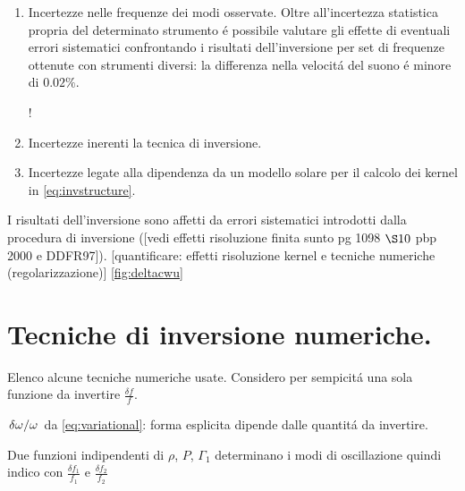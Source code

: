 \documentclass[../main.tex]{subfiles}
\begin{document}
\begin{enumerate}

\item Incertezze nelle frequenze dei modi osservate. Oltre all'incertezza statistica propria del determinato strumento \'e possibile valutare gli effette di eventuali errori sistematici confrontando i risultati dell'inversione per set di frequenze ottenute con strumenti diversi: la differenza nella velocit\'a del suono \'e minore di $0.02\%$.

\begin{workout}
!
\end{workout}


\item Incertezze inerenti la tecnica di inversione.

\item Incertezze legate alla dipendenza da un modello solare per il calcolo dei kernel in \eqref{eq:invstructure}.

\end{enumerate}

\begin{workout}
I risultati dell'inversione sono affetti da errori sistematici introdotti dalla procedura di inversione ([vedi effetti risoluzione finita sunto pg 1098 $\S 10$ pbp 2000 e DDFR97]).
[quantificare: effetti risoluzione kernel e tecniche numeriche (regolarizzazione)]
\ref{fig:deltacwu}
\end{workout}

\section{Tecniche di inversione numeriche.}

Elenco alcune tecniche numeriche usate. Considero per sempicit\'a una sola funzione da invertire $\frac{\delta f}{f}$.

\begin{workout}

$\left.{\delta\omega}\middle/{\omega}\right.$ da \eqref{eq:variational}: forma esplicita dipende dalle quantit\'a da invertire.

Due funzioni indipendenti di $\rho$, $P$, $\Gamma_1$ determinano i modi di oscillazione quindi indico con $\frac{\delta f_1}{f_1}$ e $\frac{\delta f_2}{f_2}$

\end{workout}
\end{document}
